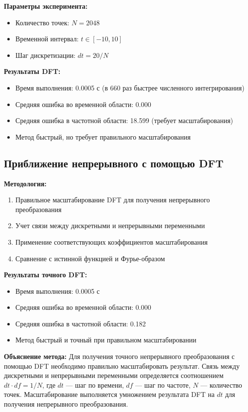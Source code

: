 \textbf{Параметры эксперимента:}
\begin{itemize}
    \item Количество точек: $N = 2048$
    \item Временной интервал: $t \in [-10, 10]$
    \item Шаг дискретизации: $dt = 20/N$
\end{itemize}

\textbf{Результаты DFT:}
\begin{itemize}
    \item Время выполнения: 0.0005 с (в 660 раз быстрее численного интегрирования)
    \item Средняя ошибка во временной области: 0.000
    \item Средняя ошибка в частотной области: 18.599 (требует масштабирования)
    \item Метод быстрый, но требует правильного масштабирования
\end{itemize}

\subsection*{Приближение непрерывного с помощью DFT}

\textbf{Методология:}
\begin{enumerate}
    \item Правильное масштабирование DFT для получения непрерывного преобразования
    \item Учет связи между дискретными и непрерывными переменными
    \item Применение соответствующих коэффициентов масштабирования
    \item Сравнение с истинной функцией и Фурье-образом
\end{enumerate}

\textbf{Результаты точного DFT:}
\begin{itemize}
    \item Время выполнения: 0.0005 с
    \item Средняя ошибка во временной области: 0.000
    \item Средняя ошибка в частотной области: 0.182
    \item Метод быстрый и точный при правильном масштабировании
\end{itemize}

\textbf{Объяснение метода:}
Для получения точного непрерывного преобразования с помощью DFT необходимо правильно масштабировать результат. Связь между дискретными и непрерывными переменными определяется соотношением $dt \cdot df = 1/N$, где $dt$ — шаг по времени, $df$ — шаг по частоте, $N$ — количество точек. Масштабирование выполняется умножением результата DFT на $dt$ для получения непрерывного преобразования.

